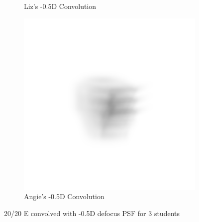 \documentclass{article}
\begin{document}
\begin{figure}[H]
\begin{subfigure}{.3\textwidth}
  \caption{Liz's -0.5D Convolution}
  \label{fig:lizn05d}
\end{subfigure}
\begin{subfigure}{.3\textwidth}
  \centering
  \includegraphics[width=1\linewidth]{Angie_R_0526_1_500_zer_-05_5_PSF_convE.png}
  \caption{Angie's -0.5D Convolution}
  \label{fig:angien05d}
\end{subfigure}

\caption{20/20 E convolved with -0.5D defocus PSF for 3 students}
\label{fig:Defocus_n05D}
\end{figure}

\clearpage
\end{document}
